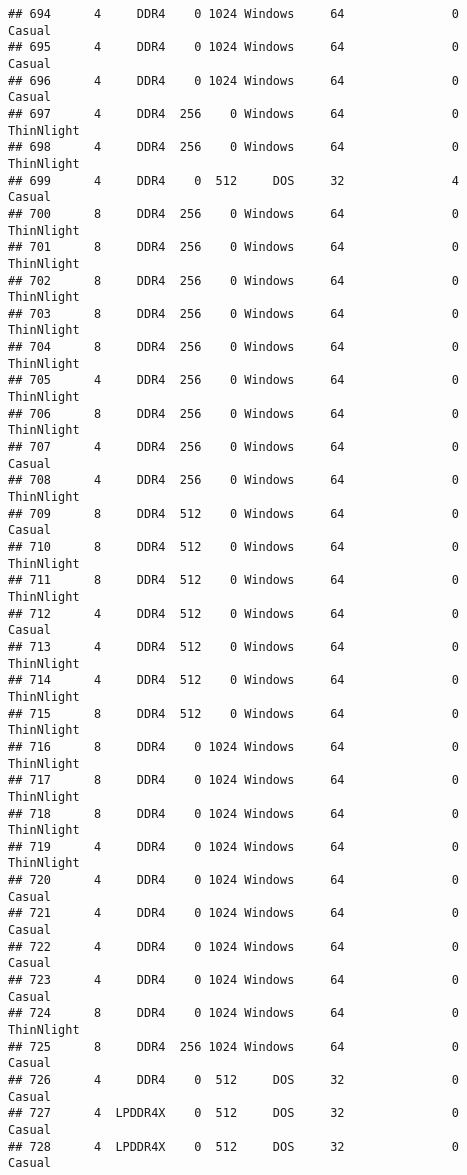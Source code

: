 \documentclass[
]{article}
\begin{document}
\begin{verbatim}
## 694      4     DDR4    0 1024 Windows     64               0     Casual
## 695      4     DDR4    0 1024 Windows     64               0     Casual
## 696      4     DDR4    0 1024 Windows     64               0     Casual
## 697      4     DDR4  256    0 Windows     64               0 ThinNlight
## 698      4     DDR4  256    0 Windows     64               0 ThinNlight
## 699      4     DDR4    0  512     DOS     32               4     Casual
## 700      8     DDR4  256    0 Windows     64               0 ThinNlight
## 701      8     DDR4  256    0 Windows     64               0 ThinNlight
## 702      8     DDR4  256    0 Windows     64               0 ThinNlight
## 703      8     DDR4  256    0 Windows     64               0 ThinNlight
## 704      8     DDR4  256    0 Windows     64               0 ThinNlight
## 705      4     DDR4  256    0 Windows     64               0 ThinNlight
## 706      8     DDR4  256    0 Windows     64               0 ThinNlight
## 707      4     DDR4  256    0 Windows     64               0     Casual
## 708      4     DDR4  256    0 Windows     64               0 ThinNlight
## 709      8     DDR4  512    0 Windows     64               0     Casual
## 710      8     DDR4  512    0 Windows     64               0 ThinNlight
## 711      8     DDR4  512    0 Windows     64               0 ThinNlight
## 712      4     DDR4  512    0 Windows     64               0     Casual
## 713      4     DDR4  512    0 Windows     64               0 ThinNlight
## 714      4     DDR4  512    0 Windows     64               0 ThinNlight
## 715      8     DDR4  512    0 Windows     64               0 ThinNlight
## 716      8     DDR4    0 1024 Windows     64               0 ThinNlight
## 717      8     DDR4    0 1024 Windows     64               0 ThinNlight
## 718      8     DDR4    0 1024 Windows     64               0 ThinNlight
## 719      4     DDR4    0 1024 Windows     64               0 ThinNlight
## 720      4     DDR4    0 1024 Windows     64               0     Casual
## 721      4     DDR4    0 1024 Windows     64               0     Casual
## 722      4     DDR4    0 1024 Windows     64               0     Casual
## 723      4     DDR4    0 1024 Windows     64               0     Casual
## 724      8     DDR4    0 1024 Windows     64               0 ThinNlight
## 725      8     DDR4  256 1024 Windows     64               0     Casual
## 726      4     DDR4    0  512     DOS     32               0     Casual
## 727      4  LPDDR4X    0  512     DOS     32               0     Casual
## 728      4  LPDDR4X    0  512     DOS     32               0     Casual

\end{verbatim}
\end{document}
